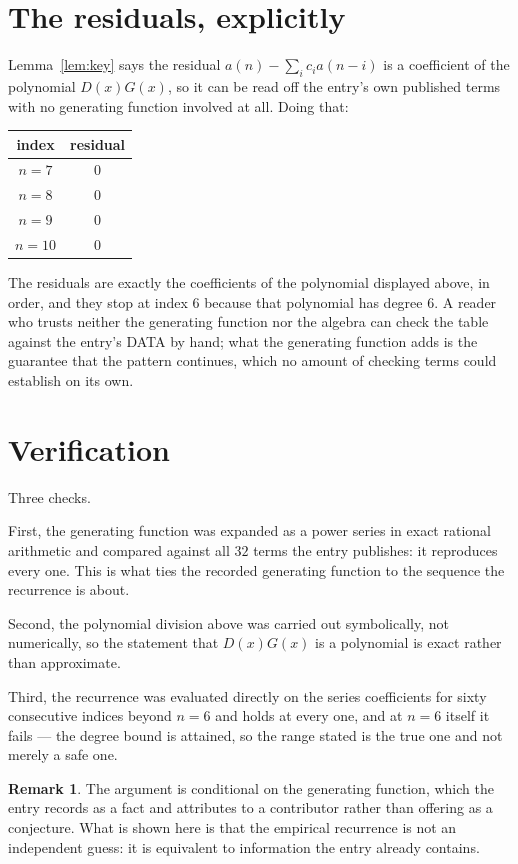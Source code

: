 \documentclass[11pt,a4paper]{article}
\theoremstyle{plain}
\theoremstyle{definition}
\newtheorem{remark}[theorem]{Remark}
\begin{document}
\section{The residuals, explicitly}

Lemma~\ref{lem:key} says the residual $a(n)-\sum_ic_ia(n-i)$ is a coefficient of the
polynomial $D(x)G(x)$, so it can be read off the entry's own published terms with no
generating function involved at all. Doing that:
\begin{center}
\begin{tabular}{cc}
index & residual \\ \hline
$n=7$ & $0$ \\
$n=8$ & $0$ \\
$n=9$ & $0$ \\
$n=10$ & $0$
\end{tabular}
\end{center}
The residuals are exactly the coefficients of the polynomial displayed above, in order, and
they stop at index $6$ because that polynomial has degree $6$. A reader who trusts
neither the generating function nor the algebra can check the table against the entry's DATA
by hand; what the generating function adds is the guarantee that the pattern continues, which
no amount of checking terms could establish on its own.

\section{Verification}

Three checks.

First, the generating function was expanded as a power series in exact rational arithmetic and
compared against all $32$ terms the entry publishes: it reproduces every one. This is
what ties the recorded generating function to the sequence the recurrence is about.

Second, the polynomial division above was carried out symbolically, not numerically, so the
statement that $D(x)G(x)$ is a polynomial is exact rather than approximate.

Third, the recurrence was evaluated directly on the series coefficients for sixty consecutive
indices beyond $n=6$ and holds at every one, and at $n=6$ itself it fails --- the
degree bound is attained, so the range stated is the true one and not merely a safe one.

\begin{remark}
The argument is conditional on the generating function, which the entry records as a fact and
attributes to a contributor rather than offering as a conjecture. What is shown here is that
the empirical recurrence is not an independent guess: it is equivalent to information the
entry already contains.
\end{remark}
\end{document}

